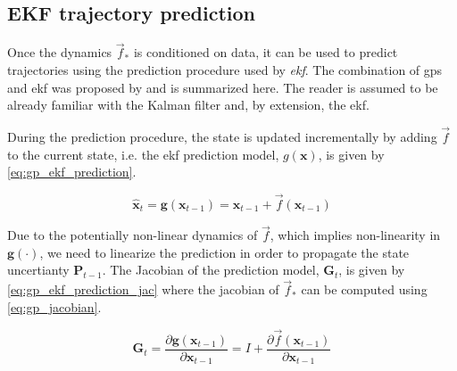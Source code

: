 \subsection{EKF trajectory prediction}
Once the dynamics $\vec{f}_*$ is conditioned on data, it can be used to predict trajectories using the prediction procedure used by \textit{\acrfull{ekf}}. The combination of \acrshort{gp}s and \acrshort{ekf} was proposed by \cite{gpekf} and is summarized here. The reader is assumed to be already familiar with the Kalman filter and, by extension, the \acrshort{ekf}.

During the prediction procedure, the state is updated incrementally by adding $\vec{f}$ to the current state, i.e. the \acrshort{ekf} prediction model, $g(\boldsymbol{x})$, is given by \cref{eq:gp_ekf_prediction}.

\begin{equation}\label{eq:gp_ekf_prediction}
    \hat{\boldsymbol{x}}_{t} = \boldsymbol{g}(\boldsymbol{x}_{t-1}) = \boldsymbol{x}_{t-1} + \vec{f}(\boldsymbol{x}_{t-1})
\end{equation}

Due to the potentially non-linear dynamics of $\vec{f}$, which implies non-linearity in $\boldsymbol{g}(\cdot)$, we need to linearize the prediction in order to propagate the state uncertianty $\boldsymbol{P}_{t-1}$. The Jacobian of the prediction model, $\boldsymbol{G}_t$, is given by \cref{eq:gp_ekf_prediction_jac} where the jacobian of $\vec{f}_*$ can be computed using \cref{eq:gp_jacobian}. 

\begin{equation}\label{eq:gp_ekf_prediction_jac}
    \boldsymbol{G}_t = \frac{\partial \boldsymbol{g}(\boldsymbol{x}_{t-1})}{\partial \boldsymbol{x}_{t-1}} = I + \frac{\partial \vec{f}(\boldsymbol{x}_{t-1})}{\partial \boldsymbol{x}_{t-1}}
\end{equation}


